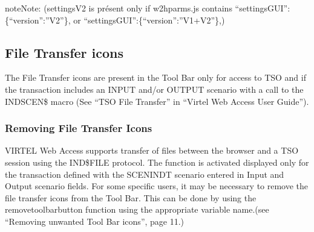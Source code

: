 \documentclass[letterpaper,10pt,english]{sphinxmanual}
\begin{document}
\begin{sphinxadmonition}{note}{Note:}
(settingsV2 is présent only if w2hparms.js contains “settingsGUI”:\{“version”:”V2”\}, or “settingsGUI”:\{“version”:”V1+V2”\},)
\end{sphinxadmonition}

\ignorespaces 
{}\ignorespaces 

\subsection{File Transfer icons}
\label{\detokenize{Customization:file-transfer-icons}}\label{\detokenize{Customization:index-28}}
The File Transfer icons are present in the Tool Bar only for access to TSO and if the transaction includes an INPUT and/or OUTPUT scenario with a call to the INDSCEN\$ macro (See “TSO File Transfer” in “Virtel Web Access User Guide”).

\ignorespaces 

\subsubsection{Removing File Transfer Icons}
\label{\detokenize{Customization:removing-file-transfer-icons}}\label{\detokenize{Customization:index-29}}
VIRTEL Web Access supports transfer of files between the browser and a TSO session using the IND\$FILE protocol. The function is activated displayed only for the transaction defined with the SCENINDT scenario entered in Input and Output scenario fields. For some specific users, it may be necessary to remove the file transfer icons from the Tool Bar.
This can be done by using the removetoolbarbutton function using the appropriate variable name.(see “Removing unwanted Tool Bar icons”, page 11.)

\ignorespaces 
\end{document}
